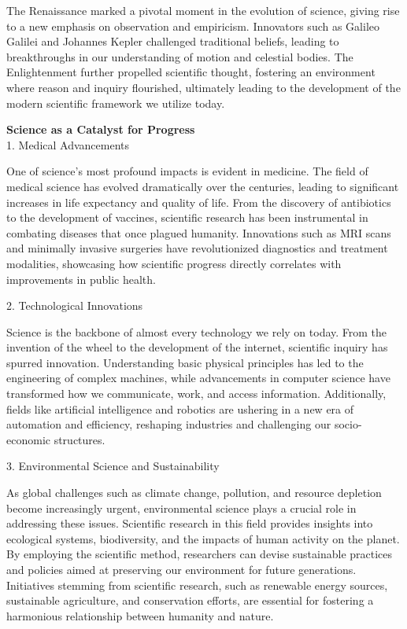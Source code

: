 \documentclass[12pt, a4paper, twocolumn]{article}
\begin{document}
The Renaissance marked a pivotal moment in the evolution of science, giving rise to a new emphasis on observation and empiricism. Innovators such as Galileo Galilei and Johannes Kepler challenged traditional beliefs, leading to breakthroughs in our understanding of motion and celestial bodies. The Enlightenment further propelled scientific thought, fostering an environment where reason and inquiry flourished, ultimately leading to the development of the modern scientific framework we utilize today.

\textbf{Science as a Catalyst for Progress}\\

1. Medical Advancements

One of science's most profound impacts is evident in medicine. The field of medical science has evolved dramatically over the centuries, leading to significant increases in life expectancy and quality of life. From the discovery of antibiotics to the development of vaccines, scientific research has been instrumental in combating diseases that once plagued humanity. Innovations such as MRI scans and minimally invasive surgeries have revolutionized diagnostics and treatment modalities, showcasing how scientific progress directly correlates with improvements in public health.

2. Technological Innovations

Science is the backbone of almost every technology we rely on today. From the invention of the wheel to the development of the internet, scientific inquiry has spurred innovation. Understanding basic physical principles has led to the engineering of complex machines, while advancements in computer science have transformed how we communicate, work, and access information. Additionally, fields like artificial intelligence and robotics are ushering in a new era of automation and efficiency, reshaping industries and challenging our socio-economic structures.

3. Environmental Science and Sustainability

As global challenges such as climate change, pollution, and resource depletion become increasingly urgent, environmental science plays a crucial role in addressing these issues. Scientific research in this field provides insights into ecological systems, biodiversity, and the impacts of human activity on the planet. By employing the scientific method, researchers can devise sustainable practices and policies aimed at preserving our environment for future generations. Initiatives stemming from scientific research, such as renewable energy sources, sustainable agriculture, and conservation efforts, are essential for fostering a harmonious relationship between humanity and nature.
\end{document}
